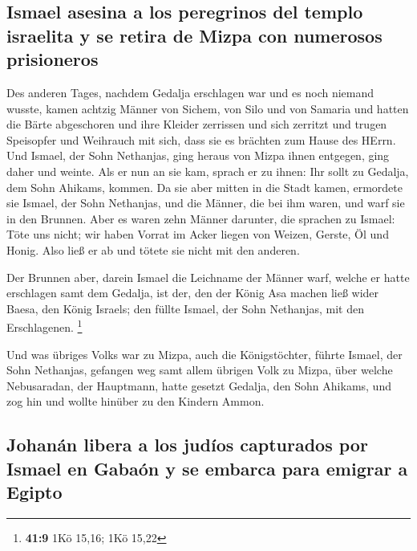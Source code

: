 \hypertarget{ismael-asesina-a-los-peregrinos-del-templo-israelita-y-se-retira-de-mizpa-con-numerosos-prisioneros}{%
\subsection{Ismael asesina a los peregrinos del templo israelita y se
retira de Mizpa con numerosos
prisioneros}\label{ismael-asesina-a-los-peregrinos-del-templo-israelita-y-se-retira-de-mizpa-con-numerosos-prisioneros}}

 Des anderen Tages, nachdem Gedalja erschlagen war und es
noch niemand wusste,  kamen achtzig Männer von Sichem, von
Silo und von Samaria und hatten die Bärte abgeschoren und ihre Kleider
zerrissen und sich zerritzt und trugen Speisopfer und Weihrauch mit
sich, dass sie es brächten zum Hause des HErrn.  Und
Ismael, der Sohn Nethanjas, ging heraus von Mizpa ihnen entgegen, ging
daher und weinte. Als er nun an sie kam, sprach er zu ihnen: Ihr sollt
zu Gedalja, dem Sohn Ahikams, kommen.  Da sie aber mitten
in die Stadt kamen, ermordete sie Ismael, der Sohn Nethanjas, und die
Männer, die bei ihm waren, und warf sie in den Brunnen. 
Aber es waren zehn Männer darunter, die sprachen zu Ismael: Töte uns
nicht; wir haben Vorrat im Acker liegen von Weizen, Gerste, Öl und
Honig. Also ließ er ab und tötete sie nicht mit den anderen.

 Der Brunnen aber, darein Ismael die Leichname der Männer
warf, welche er hatte erschlagen samt dem Gedalja, ist der, den der
König Asa machen ließ wider Baesa, den König Israels; den füllte Ismael,
der Sohn Nethanjas, mit den Erschlagenen. \footnote{\textbf{41:9} 1Kö
  15,16; 1Kö 15,22}

 Und was übriges Volks war zu Mizpa, auch die
Königstöchter, führte Ismael, der Sohn Nethanjas, gefangen weg samt
allem übrigen Volk zu Mizpa, über welche Nebusaradan, der Hauptmann,
hatte gesetzt Gedalja, den Sohn Ahikams, und zog hin und wollte hinüber
zu den Kindern Ammon.

\hypertarget{johanuxe1n-libera-a-los-juduxedos-capturados-por-ismael-en-gabauxf3n-y-se-embarca-para-emigrar-a-egipto}{%
\subsection{Johanán libera a los judíos capturados por Ismael en Gabaón
y se embarca para emigrar a
Egipto}\label{johanuxe1n-libera-a-los-juduxedos-capturados-por-ismael-en-gabauxf3n-y-se-embarca-para-emigrar-a-egipto}}

